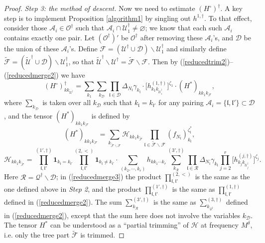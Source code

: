 \documentclass[11 pt,reqno]{amsart}
\theoremstyle{definition}
\theoremstyle{remark}
\numberwithin{equation}{section}
\newcommand{\Dc}{\mathcal{D}}
\newcommand{\Fc}{\mathcal{F}}
\newcommand{\Qc}{\mathcal{Q}}
\newcommand{\Rc}{\mathcal{R}}
\newcommand{\Uc}{\mathcal{U}}
\newcommand{\Ac}{\mathcal{A}}
\newcommand{\Hc}{\mathcal{H}}
\newcommand{\lf}{\mathfrak{l}}
\newcommand{\Os}{\mathscr{O}}
\begin{document}
{\begin{proof}
\emph{Step 3: the method of descent.} Now we need to estimate $(H^\circ)^\dagger$. A key step is to implement Proposition \ref{algorithm1} by singling out $h^{1,\dagger}$. To that effect, consider those $\Ac_i\in\Os^\dagger$ such that $\Ac_i\cap \Uc_1^\dagger\neq\varnothing$; we know that each such $\Ac_i$ contains exactly one pair. Let $(\Os^{\dagger})'$ be $\Os^\dagger$ after removing these $\Ac_i$'s, and $\Dc$ be the union of these $\Ac_i$'s. Define $\Fc=(\Uc^\dagger\cup\Dc)\backslash\Uc_1^\dagger$ and similarly define $\widetilde{\Fc}=(\widetilde{\Uc}^\dagger\cup\Dc)\backslash\Uc_1^\dagger$, so that $\widetilde{\Uc}^\dagger\backslash \Uc^\dagger=\widetilde{\Fc}\backslash\Fc$.  Then by (\ref{reducedtrim2})--(\ref{reducedmerge2}) we have
\begin{equation}\label{separate}
(H^\circ)_{kk_{\Uc^\dagger}}^\dagger=\sum_{k_1}\sum_{k_\Dc}\prod_{\lf\in\Dc}\Delta_{N_\lf}\gamma_{k_\lf}\cdot\big[h_{k_1k_{\Uc_1^\dagger}}^{(1,\dagger)}\big]^{\zeta_1}\cdot (H^*)_{kk_1k_\Fc},
\end{equation} where $\sum_{k_\Dc}$ is taken over all $k_\Dc$ such that $k_\lf=k_{\lf'}$ for any pairing $\Ac_i=\{\lf,\lf'\}\subset\Dc$, and the tensor $(H^*)_{kk_1k_\Fc}$ is defined by
\begin{equation}\label{reducedtrim3}(H^*)_{kk_1k_\Fc}=\sum_{k_{\widetilde{\Fc}\backslash\Fc}}\Hc_{kk_1k_{\widetilde{\Fc}}}\prod_{\lf\in\widetilde{\Fc}\backslash\Fc}(f_{N_\lf})_{k_\lf}^{\zeta_\lf^*},
\end{equation}
\begin{equation}\label{reducedmerge3}\Hc_{kk_1k_{\widetilde{\Fc}}}=\prod_{\lf,\lf'}^{(1',\dagger)}\mathbf{1}_{k_\lf=k_{\lf'}}\prod_{\lf,\lf'}^{(2,<)}\mathbf{1}_{k_\lf\neq k_{\lf'}}\cdot\sum_{(k_2,\cdots,k_r)}h_{kk_1\cdots k_r}\sum_{k_{\Rc}}^{(3',\dagger)}\prod_{\lf\in\Rc}\Delta_{N_\lf}\gamma_{k_\lf}\prod_{j=2}^{r}\big[h_{k_jk_{\Uc_j^\dagger}}^{(j,\dagger)}\big]^{\zeta_j}.
\end{equation}  Here $\Rc=\Qc^\dagger\backslash\Dc$; in (\ref{reducedmerge3}) the product $\prod_{\lf,\lf'}^{(2,<)}$ is the same as the one defined above in \emph{Step 2}, and the product $\prod_{\lf,\lf'}^{(1',\dagger)}$ is the same as $\prod_{\lf,\lf'}^{(1,\dagger)}$ defined in (\ref{reducedmerge2}). The sum $\sum_{k_{\Rc}}^{(3',\dagger)}$ is the same as $\sum_{k_{\Qc^\dagger}}^{(3,\dagger)}$ defined {in (\ref{reducedmerge2})}, except that the sum here does not involve the variables $k_\Dc$. 
The tensor $H^*$ can be understood as a ``partial trimming'' of $\Hc$ at frequency $M^\delta$, i.e. only the tree part $\widetilde{\Fc}$ is trimmed.


\end{proof}}
\end{document}
